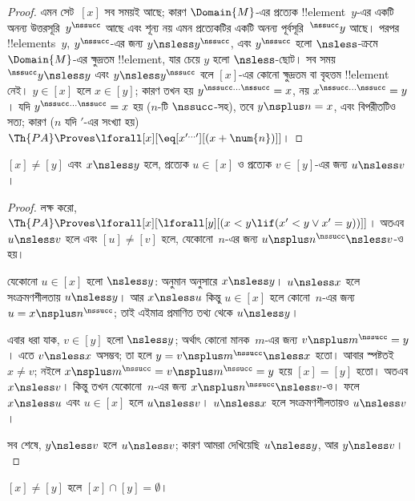 \documentclass[../../../include/open-logic-section]{subfiles}
\begin{document}
\begin{proof}
এমন সেট~$[x]$ সব সময়ই আছে; কারণ $\Domain{M}$-এর প্রত্যেক
!!{element}~$y$-এর একটি অনন্য উত্তরসূরি~$y^\nssucc$ আছে এবং শূন্য নয়
এমন প্রত্যেকটির একটি অনন্য পূর্বসূরি~$^\nssucc y$ আছে। পরপর
!!{element}s~$y$, $y^\nssucc$-এর জন্য $y \nsless y^\nssucc$, এবং
$y^\nssucc$ হলো $\nsless$-ক্রমে $\Domain{M}$-এর ক্ষুদ্রতম
!!{element}, যার চেয়ে $y$ হলো $\nsless$-ছোট। সব সময়
$^\nssucc y \nsless y$ এবং
$y \nsless y^\nssucc$ বলে $[x]$-এর কোনো ক্ষুদ্রতম বা বৃহত্তম
!!{element} নেই। $y \in [x]$ হলে $x \in [y]$; কারণ তখন হয়
$y^{\nssucc\dots\nssucc}=x$, নয় $x^{\nssucc\dots\nssucc}=y$। যদি
$y^{\nssucc\dots\nssucc}=x$ হয় ($n$-টি $\nssucc$-সহ), তবে
$y \nsplus n=x$, এবং বিপরীতটিও সত্য; কারণ ($n$ যদি $\prime$-এর সংখ্যা
হয়) $\Th{PA} \Proves \lforall[x][\eq[x^{\prime\dots\prime}][(x +
    \num{n})]]$।
\end{proof}

\begin{prop}
$[x] \neq [y]$ এবং $x \nsless y$ হলে, প্রত্যেক $u \in [x]$ ও প্রত্যেক
$v \in [y]$-এর জন্য $u \nsless v$।
\end{prop}

\begin{proof}
লক্ষ করো, $\Th{PA} \Proves \lforall[x][\lforall[y][(x < y \lif (x' < y
    \lor x' = y))]]$। অতএব $u \nsless v$ হলে এবং $[u]\neq[v]$ হলে,
যেকোনো~$n$-এর জন্য $u \nsplus n^\nssucc \nsless v$-ও হয়।

যেকোনো $u \in [x]$ হলো $\nsless y$: অনুমান অনুসারে
$x \nsless y$। $u \nsless x$ হলে সংক্রমণশীলতায় $u \nsless y$। আর
$x \nsless u$ কিন্তু $u \in [x]$ হলে কোনো~$n$-এর জন্য
$u=x\nsplus n^\nssucc$; তাই এইমাত্র প্রমাণিত তথ্য থেকে $u \nsless y$।

এবার ধরা যাক, $v \in [y]$ হলো $\nsless y$; অর্থাৎ কোনো মানক~$m$-এর
জন্য $v \nsplus m^\nssucc=y$। এতে $v \nsless x$ অসম্ভব; তা হলে
$y=v \nsplus m^\nssucc \nsless x$ হতো। আবার স্পষ্টতই $x\neq v$;
নইলে $x \nsplus m^\nssucc=v \nsplus m^\nssucc=y$ হয়ে
$[x]=[y]$ হতো। অতএব $x \nsless v$। কিন্তু তখন যেকোনো~$n$-এর জন্য
$x \nsplus n^\nssucc \nsless v$-ও। ফলে $x \nsless u$ এবং
$u \in [x]$ হলে $u \nsless v$। $u \nsless x$ হলে সংক্রমণশীলতায়ও
$u \nsless v$।

সব শেষে, $y \nsless v$ হলে $u \nsless v$; কারণ আমরা দেখিয়েছি
$u \nsless y$, আর $y \nsless v$।
\end{proof}

\begin{cor}
$[x] \neq [y]$ হলে $[x] \cap [y] = \emptyset$।
\end{cor}
\end{document}

